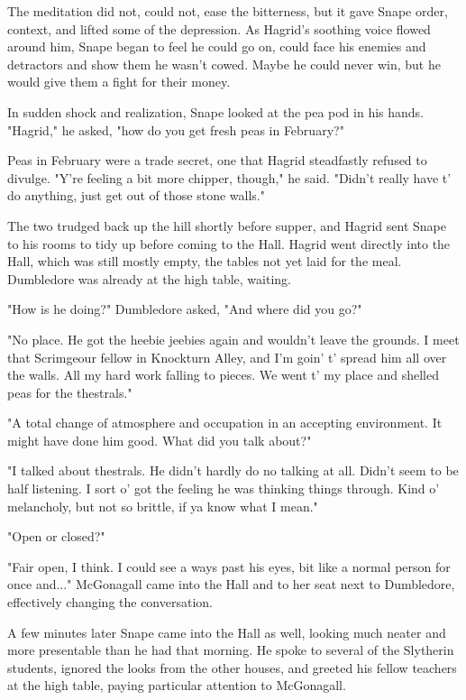 The meditation did not, could not, ease the bitterness, but it gave Snape order, context, and lifted some of the depression. As Hagrid's soothing voice flowed around him, Snape began to feel he could go on, could face his enemies and detractors and show them he wasn't cowed. Maybe he could never win, but he would give them a fight for their money.

In sudden shock and realization, Snape looked at the pea pod in his hands. "Hagrid," he asked, "how do you get fresh peas in February?"

Peas in February were a trade secret, one that Hagrid steadfastly refused to divulge. "Y're feeling a bit more chipper, though," he said. "Didn't really have t' do anything, just get out of those stone walls."

The two trudged back up the hill shortly before supper, and Hagrid sent Snape to his rooms to tidy up before coming to the Hall. Hagrid went directly into the Hall, which was still mostly empty, the tables not yet laid for the meal. Dumbledore was already at the high table, waiting.

"How is he doing?" Dumbledore asked, "And where did you go?"

"No place. He got the heebie jeebies again and wouldn't leave the grounds. I meet that Scrimgeour fellow in Knockturn Alley, and I'm goin' t' spread him all over the walls. All my hard work falling to pieces. We went t' my place and shelled peas for the thestrals."

"A total change of atmosphere and occupation in an accepting environment. It might have done him good. What did you talk about?"

"I talked about thestrals. He didn't hardly do no talking at all. Didn't seem to be half listening. I sort o' got the feeling he was thinking things through. Kind o' melancholy, but not so brittle, if ya know what I mean."

"Open or closed?"

"Fair open, I think. I could see a ways past his eyes, bit like a normal person for once and..." McGonagall came into the Hall and to her seat next to Dumbledore, effectively changing the conversation.

A few minutes later Snape came into the Hall as well, looking much neater and more presentable than he had that morning. He spoke to several of the Slytherin students, ignored the looks from the other houses, and greeted his fellow teachers at the high table, paying particular attention to McGonagall.

